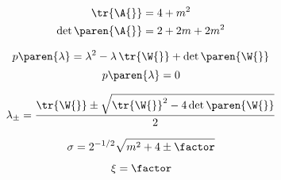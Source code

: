   \begin{equation*}   %
    \begin{split}
      \tr {\A{}} &= 4 + m^{2} \\
      \det \paren{\A{}} &= 2 + 2m + 2m^{2}
    \end{split}
  \end{equation*}

  \begin{equation*}   %
      p\paren{\lambda} = \lambda^{2} - \lambda \, \tr{\W{}} + \det\paren{\W{}}
  \end{equation*}
  \begin{equation*}   %
      p\paren{\lambda} = 0
  \end{equation*}

  \begin{equation*}   %
      \lambda_{\pm} = \frac{\tr{\W{}} \pm \sqrt{ \tr{\W{}}^{2} - 4 \det\paren{\W{}} } } {2}
  \end{equation*}


  \begin{equation*}   %
      \sigma = 2^{-1/2} \sqrt{m^{2} + 4 \pm \factor}
  \end{equation*}

  \begin{equation*}   %
      \xi = \factor
  \end{equation*}

